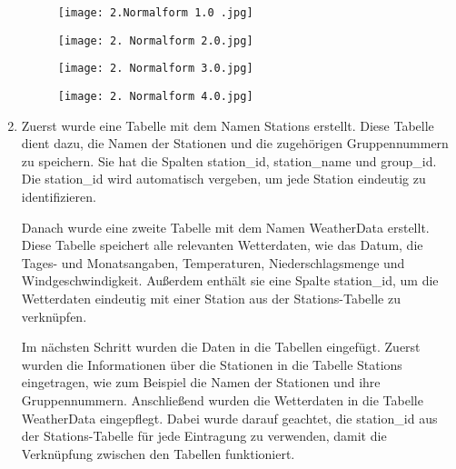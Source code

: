 \documentclass{article}
\begin{document}
\begin{enumerate}
\begin{figure}[H] %
    \centering
    \texttt{[image: 2.Normalform 1.0 .jpg]}
\end{figure}

\begin{figure}[H] %
    \centering
    \texttt{[image: 2. Normalform 2.0.jpg]}
\end{figure}

\begin{figure}[H] %
    \centering
    \texttt{[image: 2. Normalform 3.0.jpg]}
\end{figure}



\begin{figure}[H] %
    \centering
    \texttt{[image: 2. Normalform 4.0.jpg]}
\end{figure}

\newpage
\item Zuerst wurde eine Tabelle mit dem Namen Stations erstellt. Diese Tabelle dient dazu, die Namen der Stationen und die zugehörigen Gruppennummern zu speichern. Sie hat die Spalten station\_id, station\_name und group\_id. Die station\_id wird automatisch vergeben, um jede Station eindeutig zu identifizieren.

Danach wurde eine zweite Tabelle mit dem Namen WeatherData erstellt. Diese Tabelle speichert alle relevanten Wetterdaten, wie das Datum, die Tages- und Monatsangaben, Temperaturen, Niederschlagsmenge und Windgeschwindigkeit. Außerdem enthält sie eine Spalte station\_id, um die Wetterdaten eindeutig mit einer Station aus der Stations-Tabelle zu verknüpfen.

Im nächsten Schritt wurden die Daten in die Tabellen eingefügt. Zuerst wurden die Informationen über die Stationen in die Tabelle Stations eingetragen, wie zum Beispiel die Namen der Stationen und ihre Gruppennummern. Anschließend wurden die Wetterdaten in die Tabelle WeatherData eingepflegt. Dabei wurde darauf geachtet, die station\_id aus der Stations-Tabelle für jede Eintragung zu verwenden, damit die Verknüpfung zwischen den Tabellen funktioniert.


\end{enumerate}
\end{document}
